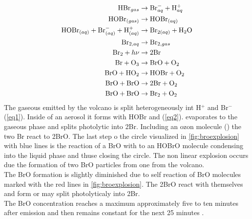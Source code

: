 \documentclass  [
  paper    = a4,
  BCOR     = 10mm,
  twoside,
  fontsize = 12pt,
  fleqn,
  toc      = bibnumbered,
  toc      = listofnumbered,
  numbers  = noendperiod,
  headings = normal,
  listof   = leveldown,
  version  = 3.03
]                                       {scrreprt}
\begin{document}
\begin{align}
\ce{HBr}_{gas} &\rightarrow \ce{Br}^{-}_{aq} + \ce{H}^{+}_{aq} \label{eq1}\\
\ce{HOBr}_{(gas)} &\rightarrow \ce{HOBr}_{(aq)} \\
\ce{HOBr}_{(aq)} + \ce{Br}^{-}_{(aq)} + \ce{H}^{+}_{(aq)} &\rightarrow
\ce{Br}_{2(aq)} +  \ce{H2O}\label{eq2}\\
\ce{Br}_{2,aq} &\rightarrow \ce{Br}_{2,gas} \\
\ce{Br2} + h\nu &\rightarrow 2 \ce{Br} \\
\ce{Br} + \ce{O3} &\rightarrow \ce{BrO} + \ce{O2} \\
\ce{BrO} + \ce{HO2} &\rightarrow \ce{HOBr} + \ce{O2} \\
\ce{BrO} + \ce{BrO} &\rightarrow 2 \ce{Br} + \ce{O2} \\
\ce{BrO} + \ce{BrO} &\rightarrow \ce{Br2} + \ce{O2}
\end{align}
The gaseous  emitted by the volcano is split heterogeneously int H$^{+}$ and Br$^{-}$ (\cref{eq1}). Inside of an aerosol it forms with HOBr  and  (\cref{eq2}).  evaporates to the gaseous phase and splits photolytic  into 2Br. Including an ozon molecule () the two Br react to 2BrO. The last step o the circle visualized in \cref{fig:broexplosion} with blue lines is the reaction of a BrO with  to an HOBrO molecule condensing into the liquid phase  and thuse closing the circle. The non linear explosion occurs due the formation of two BrO particles from one  from the volcano.\\
The BrO formation is slightly diminished due to self reaction of BrO molecules marked with the red lines in \cref{fig:broexplosion}. The 2BrO react with themselves and form  or may split photolyticaly into 2Br.\\
The BrO concentration reaches a maximum approximately five to ten minutes after emission and then remains constant for the next 25 minutes \citet{lubcke2014bro}.
\end{document}
